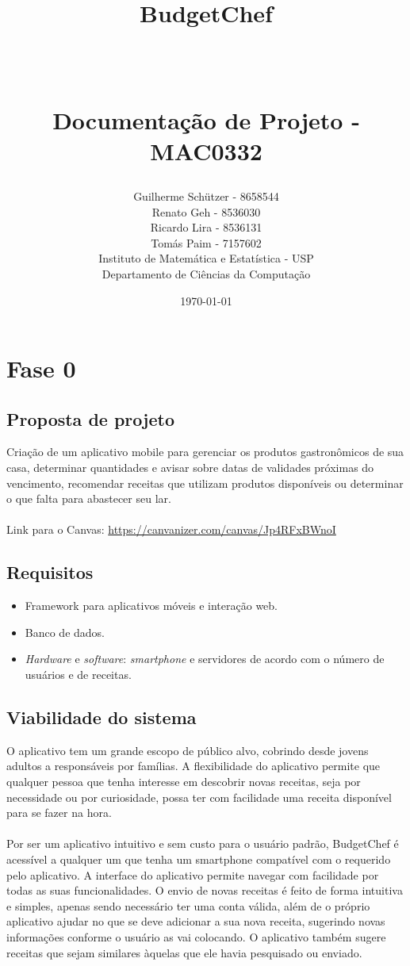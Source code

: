 \documentclass[paper=a4, fontsize=11pt]{scrartcl}	%
\title{ \vspace{-1in} 	\usefont{OT1}{bch}{b}{n}
		\huge \strut BudgetChef \strut \\
		\Large \bfseries \strut Documentação de Projeto - MAC0332 \strut
}
\author{
				Guilherme Schützer - 8658544\\
				Renato Geh - 8536030\\
				Ricardo Lira - 8536131\\
				Tomás Paim - 7157602\\ \usefont{OT1}{bch}{m}{n}
        Instituto de Matemática e Estatística - USP\\	\usefont{OT1}{bch}{m}{n}
        Departamento de Ciências da Computação\\
}
\date{\today}
\numberwithin{equation}{section}															%
\numberwithin{figure}{section}																%
\numberwithin{table}{section}																%
\begin{document}
\maketitle
\addtocounter{section}{-1}
\section*{Fase 0}

\addtocounter{section}{1}

\subsection{Proposta de projeto}

Criação de um aplicativo mobile para gerenciar os produtos gastronômicos de sua casa, determinar quantidades e avisar sobre datas de validades próximas do vencimento, recomendar receitas que utilizam produtos disponíveis ou determinar o que falta para abastecer seu lar.
\\ \\ Link para o Canvas: \url{https://canvanizer.com/canvas/Jp4RFxBWnoI}

\subsection{Requisitos}

\begin{itemize}

\item Framework para aplicativos móveis e interação web.
\item Banco de dados.
\item \emph{Hardware} e \emph{software}: \emph{smartphone} e servidores de acordo com o número de usuários e de receitas.

\end{itemize}

\subsection{Viabilidade do sistema}

O aplicativo tem um grande escopo de público alvo, cobrindo desde jovens adultos a responsáveis por famílias. A flexibilidade do aplicativo permite que qualquer pessoa que tenha interesse em descobrir novas receitas, seja por necessidade ou por curiosidade, possa ter com facilidade uma receita disponível para se fazer na hora.
\\ \\
Por ser um aplicativo intuitivo e sem custo para o usuário padrão, BudgetChef é acessível a qualquer um que tenha um smartphone compatível com o requerido pelo aplicativo.
\newpage
A interface do aplicativo permite navegar com facilidade por todas as suas funcionalidades. O envio de novas receitas é feito de forma intuitiva e simples, apenas sendo necessário ter uma conta válida, além de o próprio aplicativo ajudar no que se deve adicionar a sua nova receita, sugerindo novas informações conforme o usuário as vai colocando. O aplicativo também sugere receitas que sejam similares àquelas que ele havia pesquisado ou enviado.
\end{document}
